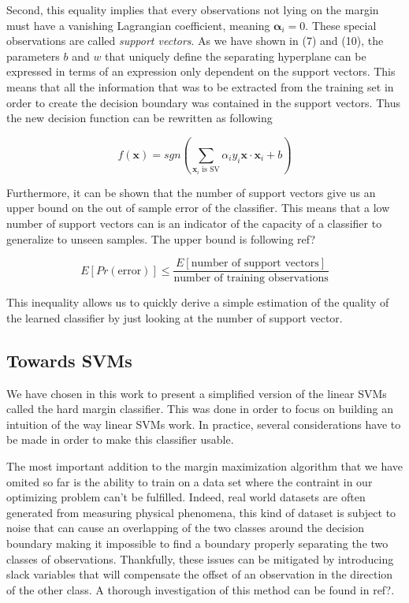 Second, this equality implies that every observations not lying on the margin must have a vanishing Lagrangian coefficient, meaning $\boldsymbol{\alpha}_i = 0$. These special observations are called \textit{support vectors}. As we have shown in (7) and (10), the parameters $b$ and $w$ that uniquely define the separating hyperplane can be expressed in terms of an expression only dependent on the support vectors. This means that all the information that was to be extracted from the training set in order to create the decision boundary was contained in the support vectors. Thus the new decision function can be rewritten as following

\begin{equation}
  f(\mathbf{x}) = sgn\left(\sum_{\mathbf{x}_i \text{ is SV}}\alpha_iy_i\mathbf{x} \cdot \mathbf{x}_i + b\right)
\end{equation}

Furthermore, it can be shown that the number of support vectors give us an upper bound on the out of sample error of the classifier. This means that a low number of support vectors can is an indicator of the capacity of a classifier to generalize to unseen samples. The upper bound is following \textcolor[rgb]{1,0,0}{ref?}

\begin{equation}
  E\left[Pr\left(\text{error}\right)\right] \leq \frac{E\left[\text{number of support vectors}\right]}{\text{number of training observations}}
\end{equation}

This inequality allows us to quickly derive a simple estimation of the quality of the learned classifier by just looking at the number of support vector.

\subsection{Towards SVMs}

We have chosen in this work to present a simplified version of the linear SVMs called the hard margin classifier. This was done in order to focus on building an intuition of the way linear SVMs work. In practice, several considerations have to be made in order to make this classifier usable.

The most important addition to the margin maximization algorithm that we have omited so far is the ability to train on a data set where the contraint in our optimizing problem can't be fulfilled. Indeed, real world datasets are often generated from measuring physical phenomena, this kind of dataset is subject to noise that can cause an overlapping of the two classes around the decision boundary making it impossible to find a boundary properly separating the two classes of observations. Thankfully, these issues can be mitigated by introducing slack variables that will compensate the offset of an observation in the direction of the other class. A thorough investigation of this method can be found in \textcolor[rgb]{1,0,0}{ref?}.

